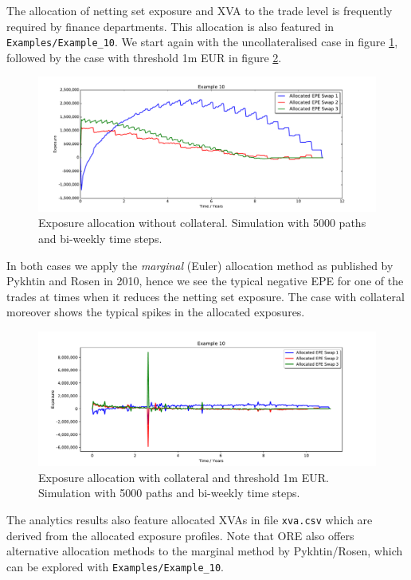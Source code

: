 \documentclass[12pt, a4paper]{article}
\begin{document}
{\medskip The allocation of netting set exposure and XVA to the trade level is frequently required by finance
departments. This allocation is also featured in {\tt Examples/Example\_10}. We start again with the uncollateralised
case in figure \ref{fig_12}, followed by the case with threshold 1m EUR in figure \ref{fig_13}.
\begin{figure}[h!]
\begin{center}
\includegraphics[scale=0.45]{mpl_nocollateral_allocated_epe.pdf}
\end{center}
\caption{Exposure allocation without collateral. Simulation with 5000 paths and bi-weekly time steps.}
\label{fig_12}
\end{figure}
In both cases we apply the {\em marginal} (Euler) allocation method as published by Pykhtin and Rosen in 2010, hence we
see the typical negative EPE for one of the trades at times when it reduces the netting set exposure. The case with
collateral moreover shows the typical spikes in the allocated exposures.
\begin{figure}[h!]
\begin{center}
\includegraphics[scale=0.45]{mpl_threshold_allocated_epe.pdf}
\end{center}
\caption{Exposure allocation with collateral and threshold 1m EUR. Simulation with 5000 paths and bi-weekly time steps.}
\label{fig_13}
\end{figure}
The analytics results also feature allocated XVAs in file {\tt xva.csv} which are derived from the allocated exposure
profiles. Note that ORE also offers alternative allocation methods to the marginal method by Pykhtin/Rosen, which can be
explored with {\tt Examples/Example\_10}.

}
\end{document}
